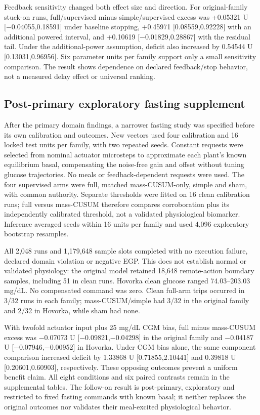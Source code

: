 \documentclass[journal,10pt,letterpaper]{IEEEtran}
\begin{document}
Feedback sensitivity changed both effect size and direction. For
original-family stuck-on runs, full/supervised minus simple/supervised
excess was +0.05321 U {[}−0.04055,0.18591{]} under baseline stopping,
+0.45971 {[}0.08559,0.92228{]} with an additional powered interval, and
+0.10619 {[}−0.01829,0.28867{]} with the residual tail. Under the
additional-power assumption, deficit also increased by 0.54544 U
{[}0.13031,0.96956{]}. Six parameter units per family support only a
small sensitivity comparison. The result shows dependence on declared
feedback/stop behavior, not a measured delay effect or universal
ranking.

\subsection{Post-primary exploratory fasting supplement}

After the primary domain findings, a narrower fasting study was
specified before its own calibration and outcomes. New vectors used four
calibration and 16 locked test units per family, with two repeated
seeds. Constant requests were selected from nominal actuator microsteps
to approximate each plant's known equilibrium basal, compensating the
noise-free gain and offset without tuning glucose trajectories. No meals
or feedback-dependent requests were used. The four supervised arms were
full, matched mass-CUSUM-only, simple and sham, with common authority.
Separate thresholds were fitted on 16 clean calibration runs; full
versus mass-CUSUM therefore compares corroboration plus its
independently calibrated threshold, not a validated physiological
biomarker. Inference averaged seeds within 16 units per family and used
4,096 exploratory bootstrap resamples.

All 2,048 runs and 1,179,648 sample slots completed with no execution
failure, declared domain violation or negative EGP. This does not
establish normal or validated physiology: the original model retained
18,648 remote-action boundary samples, including 51 in clean runs.
Hovorka clean glucose ranged 74.03--203.03 mg/dL. No compensated command
was zero. Clean full-arm trips occurred in 3/32 runs in each family;
mass-CUSUM/simple had 3/32 in the original family and 2/32 in Hovorka,
while sham had none.

With twofold actuator input plus 25 mg/dL CGM bias, full minus
mass-CUSUM excess was −0.07073 U {[}−0.09821,−0.04298{]} in the original
family and −0.04187 U {[}−0.07946,−0.00952{]} in Hovorka. Under CGM bias
alone, the same component comparison increased deficit by 1.33868 U
{[}0.71855,2.10441{]} and 0.39818 U {[}0.20601,0.60903{]}, respectively.
These opposing outcomes prevent a uniform benefit claim. All eight
conditions and six paired contrasts remain in the supplemental tables.
The follow-on result is post-primary, exploratory and restricted to
fixed fasting commands with known basal; it neither replaces the
original outcomes nor validates their meal-excited physiological
behavior.
\end{document}
